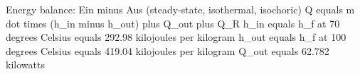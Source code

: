 Energy balance: Ein minus Aus (steady-state, isothermal, isochoric)  
Q equals m dot times (h_in minus h_out) plus Q_out plus Q_R  
h_in equals h_f at 70 degrees Celsius equals 292.98 kilojoules per kilogram  
h_out equals h_f at 100 degrees Celsius equals 419.04 kilojoules per kilogram  
Q_out equals 62.782 kilowatts